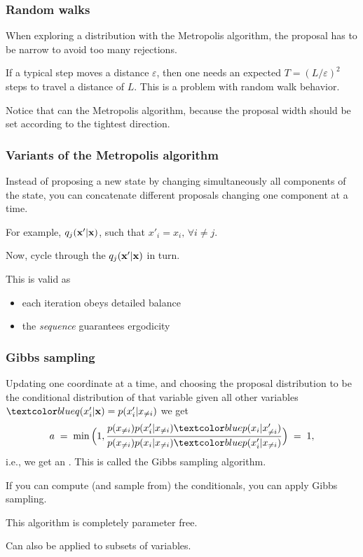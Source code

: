 \begin{frame}
\frametitle{Random walks}

When exploring a distribution with the Metropolis algorithm, the proposal has
to be narrow to avoid too many rejections.

If a typical step moves a distance $\varepsilon$, then one needs an expected
$T=(L/\varepsilon)^2$ steps to travel a distance of $L$. This is a problem with
random walk behavior.

Notice that  can  the Metropolis
algorithm, because the proposal width should be set according to the tightest
direction.
\end{frame}

\begin{frame}
\frametitle{Variants of the Metropolis algorithm}

Instead of proposing a new state by changing simultaneously all
components of the state, you can concatenate different proposals
changing one component at a time.

For example, $q_j(\mathbf x'|\mathbf x)$, such that $x'_i=x_i,\,\forall i\neq j$.

Now, cycle through the $q_j(\mathbf x'|\mathbf x)$ in turn.

This is valid as
\begin{itemize}
\item each iteration obeys detailed balance
\item the \emph{sequence} guarantees ergodicity
\end{itemize}
\end{frame}

\begin{frame}
\frametitle{Gibbs sampling}

Updating one coordinate at a time, and choosing the proposal
distribution to be the conditional distribution of that variable given
all other variables $\Blue{q(x'_i|\bfx)=p(x'_i|x_{\neq i})}$ we get
\[
a\;=\;\min\Big(1,\frac{p(x_{\neq i})p(x'_i|x_{\neq i})\Blue{p(x_i|x'_{\neq i})}}
{p(x_{\neq i})p(x_i|x_{\neq i})\Blue{p(x'_i|x_{\neq i})}}\Big)\;=\;1,
\]
i.e., we get an . This is called
the Gibbs sampling algorithm.

If you can compute (and sample from) the conditionals, you can apply Gibbs
sampling.

This algorithm is completely parameter free.

Can also be applied to subsets of variables.
\end{frame}


